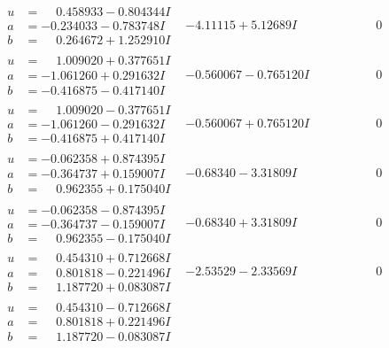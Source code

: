\documentclass[1p]{elsarticle_modified}
\theoremstyle{definition}
\begin{document}
$$\begin{array}{c|c|c}
\begin{aligned}
u &= \phantom{-}0.458933 - 0.804344 I \\
a &= -0.234033 - 0.783748 I \\
b &= \phantom{-}0.264672 + 1.252910 I\end{aligned}
 & -4.11115 + 5.12689 I & \phantom{-0.000000 } 0 \\ \hline\begin{aligned}
u &= \phantom{-}1.009020 + 0.377651 I \\
a &= -1.061260 + 0.291632 I \\
b &= -0.416875 - 0.417140 I\end{aligned}
 & -0.560067 - 0.765120 I & \phantom{-0.000000 } 0 \\ \hline\begin{aligned}
u &= \phantom{-}1.009020 - 0.377651 I \\
a &= -1.061260 - 0.291632 I \\
b &= -0.416875 + 0.417140 I\end{aligned}
 & -0.560067 + 0.765120 I & \phantom{-0.000000 } 0 \\ \hline\begin{aligned}
u &= -0.062358 + 0.874395 I \\
a &= -0.364737 + 0.159007 I \\
b &= \phantom{-}0.962355 + 0.175040 I\end{aligned}
 & -0.68340 - 3.31809 I & \phantom{-0.000000 } 0 \\ \hline\begin{aligned}
u &= -0.062358 - 0.874395 I \\
a &= -0.364737 - 0.159007 I \\
b &= \phantom{-}0.962355 - 0.175040 I\end{aligned}
 & -0.68340 + 3.31809 I & \phantom{-0.000000 } 0 \\ \hline\begin{aligned}
u &= \phantom{-}0.454310 + 0.712668 I \\
a &= \phantom{-}0.801818 - 0.221496 I \\
b &= \phantom{-}1.187720 + 0.083087 I\end{aligned}
 & -2.53529 - 2.33569 I & \phantom{-0.000000 } 0 \\ \hline\begin{aligned}
u &= \phantom{-}0.454310 - 0.712668 I \\
a &= \phantom{-}0.801818 + 0.221496 I \\
b &= \phantom{-}1.187720 - 0.083087 I\end{aligned}

\end{array}$$
\end{document}
